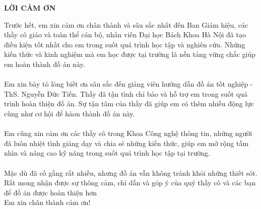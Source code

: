 \documentclass[../DoAn.tex]{subfiles}
\begin{document}
\begin{center}
    \Large{\textbf{LỜI CẢM ƠN}}\\
\end{center}
\vspace{1cm}
\hspace*{1cm} Trước hết, em xin cảm ơn chân thành và sâu sắc nhất đến Ban Giám hiệu, các thầy cô giáo và toàn thể cán bộ, nhân viên Đại học Bách Khoa Hà Nội đã tạo điều kiện tốt nhất cho em trong suốt quá trình học tập và nghiên cứu. Những kiến thức và kinh nghiệm mà em học được tại trường là nền tảng vững chắc giúp em hoàn thành đồ án này.\\ \\
\hspace*{1cm} Em xin bày tỏ lòng biết ơn sâu sắc đến giảng viên hướng dẫn đồ án tốt nghiệp - ThS. Nguyễn Đức Tiến. Thầy đã tận tình chỉ bảo và hỗ trợ em trong suốt quá trình hoàn thiện đồ án. Sự tận tâm của thầy đã giúp em có thêm nhiều động lực cũng như cơ hội để hàon thành đồ án này. \\ \\
\hspace*{1cm} Em cũng xin cảm ơn các thầy cô trong Khoa Công nghệ thông tin, những người đã luôn nhiệt tình giảng dạy và chia sẻ những kiến thức, giúp em mở rộng tầm nhìn và nâng cao kỹ năng trong suốt quá trình học tập tại trường.\\ \\
\hspace*{1cm} Mặc dù đã cố gắng rất nhiều, nhưng đồ án vẫn không tránh khỏi những thiết sót. Rất mong nhận được sự thông cảm, chỉ dẫn và góp ý của quý thầy cô và các bạn để đồ án được hoàn thiện hơn \\

Em xin chân thành cảm ơn!
\end{document}
